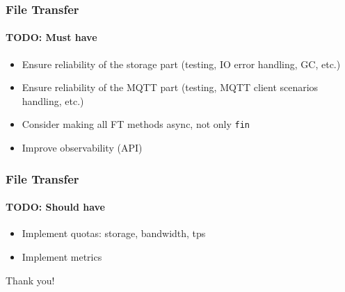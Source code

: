 \documentclass{beamer}
\begin{document}
\begin{frame}
    \frametitle{File Transfer}
    \framesubtitle{TODO: Must have}
    \begin{itemize}
        \item Ensure reliability of the storage part (testing, IO error handling, GC, etc.)
        \item Ensure reliability of the MQTT part (testing, MQTT client scenarios handling, etc.)
        \item Consider making all FT methods async, not only \lstinline{fin}
        \item Improve observability (API)
    \end{itemize}
\end{frame}

\begin{frame}
    \frametitle{File Transfer}
    \framesubtitle{TODO: Should have}
    \begin{itemize}
        \item Implement quotas: storage, bandwidth, tps
        \item Implement metrics
    \end{itemize}
\end{frame}

\begin{frame}
    \begin{center}
        Thank you!
    \end{center}
\end{frame}
\end{document}

